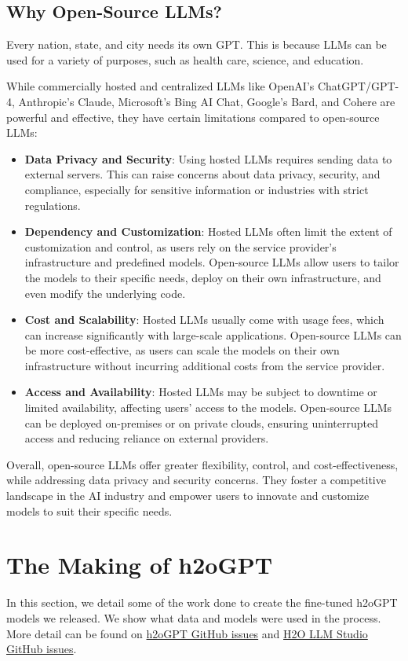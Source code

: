 \documentclass{article}
\begin{document}
\subsection{Why Open-Source LLMs?}
Every nation, state, and city needs its own GPT. This is because LLMs can be used for a variety of purposes, such as health care, science, and education.

While commercially hosted and centralized LLMs like OpenAI's ChatGPT/GPT-4, Anthropic's Claude, Microsoft's Bing AI Chat, Google's Bard, and Cohere are powerful and effective, they have certain limitations compared to open-source LLMs:
\begin{itemize}
    \item \textbf{Data Privacy and Security}: Using hosted LLMs requires sending data to external servers. This can raise concerns about data privacy, security, and compliance, especially for sensitive information or industries with strict regulations.
    \item \textbf{Dependency and Customization}: Hosted LLMs often limit the extent of customization and control, as users rely on the service provider's infrastructure and predefined models. Open-source LLMs allow users to tailor the models to their specific needs, deploy on their own infrastructure, and even modify the underlying code.
    \item \textbf{Cost and Scalability}: Hosted LLMs usually come with usage fees, which can increase significantly with large-scale applications. Open-source LLMs can be more cost-effective, as users can scale the models on their own infrastructure without incurring additional costs from the service provider.
    \item  \textbf{Access and Availability}: Hosted LLMs may be subject to downtime or limited availability, affecting users' access to the models. Open-source LLMs can be deployed on-premises or on private clouds, ensuring uninterrupted access and reducing reliance on external providers.
\end{itemize}
Overall, open-source LLMs offer greater flexibility, control, and cost-effectiveness, while addressing data privacy and security concerns. They foster a competitive landscape in the AI industry and empower users to innovate and customize models to suit their specific needs.

\section{The Making of h2oGPT}
In this section, we detail some of the work done to create the fine-tuned h2oGPT models we released. We show what data and models were used in the process.  More detail can be found on \href{https://github.com/h2oai/h2ogpt/issues}{\faGithubSquare h2oGPT GitHub issues} and \href{https://github.com/h2oai/h2o-llmstudio/issues}{\faGithubSquare H2O LLM Studio GitHub issues}.
\label{sec:headings}
\end{document}
